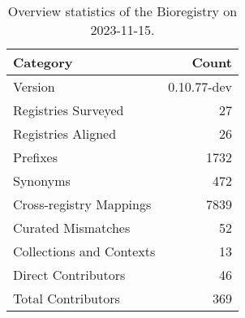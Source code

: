 \begin{table}
\caption{Overview statistics of the Bioregistry on 2023-11-15.}
\label{tab:bioregistry-summary}
\begin{tabular}{lr}
\toprule
Category & Count \\
\midrule
Version & 0.10.77-dev \\
Registries Surveyed & 27 \\
Registries Aligned & 26 \\
Prefixes & 1732 \\
Synonyms & 472 \\
Cross-registry Mappings & 7839 \\
Curated Mismatches & 52 \\
Collections and Contexts & 13 \\
Direct Contributors & 46 \\
Total Contributors & 369 \\
\bottomrule
\end{tabular}
\end{table}
